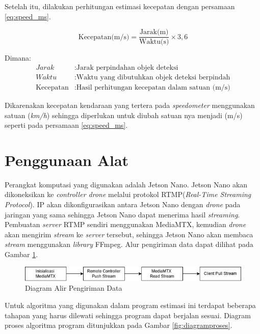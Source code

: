 Setelah itu, dilakukan perhitungan estimasi kecepatan dengan persamaan \ref{eq:speed_ms}.

\begin{equation}
  \label{eq:speed_ms}
  \text{Kecepatan(m/s)} = \frac{\text{Jarak(m)}}{\text{Waktu(s)}} \times 3{,}6
\end{equation}

\begin{flushleft}
Dimana:
\begin{align*}
Jarak & : \text{Jarak perpindahan objek deteksi} \\
Waktu & : \text{Waktu yang dibutuhkan objek deteksi berpindah} \\
\text{Kecepatan} & : \text{Hasil perhitungan kecepatan dalam satuan (m/s)}
\end{align*}
\end{flushleft}

Dikarenakan kecepatan kendaraan yang tertera pada \emph{speedometer} menggunakan satuan (\emph{km/h}) sehingga diperlukan untuk diubah satuan nya menjadi (m/s) seperti pada persamaan \ref{eq:speed_ms}.

\section{Penggunaan Alat}
Perangkat komputasi yang digunakan adalah Jetson Nano. Jetson Nano akan dikoneksikan ke \emph{controller drone} melalui protokol RTMP(\emph{Real-Time Streaming Protocol}). IP akan dikonfigurasikan antara Jetson Nano dengan \emph{drone} pada jaringan yang sama sehingga Jetson Nano dapat menerima hasil \emph{streaming}. Pembuatan \emph{server} RTMP sendiri menggunakan MediaMTX, kemudian \emph{drone} akan mengirim \emph{stream} ke \emph{server} tersebut, sehingga Jetson Nano akan membaca \emph{stream} menggunakan \emph{library} FFmpeg. Alur pengiriman data dapat dilihat pada Gambar \ref{fig:alurdata}.

\begin{figure} [H] \centering
  \includegraphics[scale=0.7]{bab3/pengirimandata.jpg}
  \caption{Diagram Alir Pengiriman Data}
  \label{fig:alurdata}
\end{figure}

Untuk algoritma yang digunakan dalam program estimasi ini terdapat beberapa tahapan yang harus dilewati sehingga program dapat berjalan sesuai. Diagram proses algoritma program ditunjukkan pada Gambar \ref{fig:diagramproses}.

